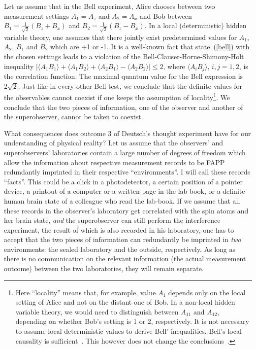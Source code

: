 \documentclass[12pt]{article}
\begin{document}
Let us assume that in the Bell experiment, Alice chooses between two measurement settings $A_1=A_z$ and $A_2= A_x$ and Bob between $B_1= \frac{1}{\sqrt{2}} (B_z + B_x)$ and $B_2 =\frac{1}{\sqrt{2}} (B_z - B_x)$. In a local (deterministic) hidden variable theory, one assumes that there jointly exist predetermined values for $A_1$, $A_2$, $B_1$ and $B_2$ which are +1 or -1.  It is a well-known fact that state~(\ref{bell}) with the chosen settings leads to a violation of the Bell-Clauser-Horne-Shimony-Holt inequality $|\langle A_1 B_1 \rangle + \langle A_1 B_2 \rangle + \langle A_2 B_1 \rangle - \langle A_2 B_2 \rangle| \leq 2$, where 
$\langle A_i B_j \rangle$, $i,j=1,2$, is the correlation function. The maximal quantum value for the Bell expression is $2\sqrt{2}$. Just like in every other Bell test, we conclude that the definite values for the observables cannot coexist if one keeps the assumption of locality\footnote{Here ``locality'' means that, for example, value $A_1$ depends only on the local setting of Alice and not on the distant one of Bob. In a non-local hidden variable theory, we would need to distinguish between $A_{11}$ and $A_{12}$, depending on whether Bob's setting is 1 or 2, respectively. It is not necessary to assume local deterministic values to derive Bell' inequalities. Bell's local causality is sufficient~\cite{bell}. This however does not change the conclusions~\cite{marek}.}. We conclude that the two pieces of information, one of the observer and another of the superobserver, cannot be taken to coexist. 

What consequences does outcome 3 of Deutsch's thought experiment have for our understanding of physical reality? Let us assume that the observers' and superobservers' laboratories contain a large number of degrees of freedom which allow the information about respective measurement records  to be FAPP redundantly imprinted in their respective ``environments''. I will call these records ``facts''. This could be a click in a photodetector, a certain position of a pointer device, a printout of a computer or a written page in the lab-book, or a definite human brain state of a colleague who read the lab-book. If we assume that all these records in the observer's laboratory get correlated with the spin atoms and her brain state, {\it and} the superobserver can still perform the interference experiment, the result of which is also recorded in his laboratory, one has to accept that the two pieces of information can redundantly be imprinted in {\it two} environments: the sealed laboratory and the outside, respectively.  As long as there is no communication on the relevant information (the actual measurement outcome) between the two laboratories, they will remain separate. 
\end{document}
